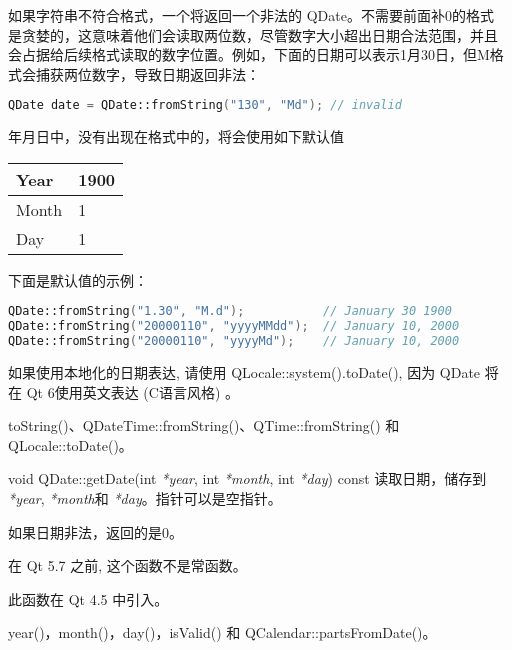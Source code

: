 如果字符串不符合格式，一个将返回一个非法的 QDate。不需要前面补0的格式
是贪婪的，这意味着他们会读取两位数，尽管数字大小超出日期合法范围，并且
会占据给后续格式读取的数字位置。例如，下面的日期可以表示1月30日，但M格
式会捕获两位数字，导致日期返回非法：

\begin{lstlisting}[language=C++]
QDate date = QDate::fromString("130", "Md"); // invalid
\end{lstlisting}

年月日中，没有出现在格式中的，将会使用如下默认值

\begin{tabular}{|l|l|}
\hline
Year&	1900\\
\hline
Month&	1\\
\hline
Day&	1\\
\hline
\end{tabular}

下面是默认值的示例：

\begin{lstlisting}[language=C++]
QDate::fromString("1.30", "M.d");           // January 30 1900
QDate::fromString("20000110", "yyyyMMdd");  // January 10, 2000
QDate::fromString("20000110", "yyyyMd");    // January 10, 2000
\end{lstlisting}



\begin{notice}
如果使用本地化的日期表达, 请使用 QLocale::system().toDate(), 因为 QDate 将在 Qt 6使用英文表达 (C语言风格) 。
\end{notice}


\begin{notice}[另请参阅]
toString()、QDateTime::fromString()、QTime::fromString() 和 QLocale::toDate()。
\end{notice}


\splitLine

void QDate::getDate(int  \emph{*year}, int \emph{*month}, int \emph{*day}) const
读取日期，储存到 \emph{*year},  \emph{*month}和 \emph{*day}。指针可以是空指针。

如果日期非法，返回的是0。

\begin{notice}
 在 Qt 5.7 之前, 这个函数不是常函数。
\end{notice}

此函数在 Qt 4.5 中引入。

\begin{notice}[另请参阅]
year()，month()，day()，isValid() 和
QCalendar::partsFromDate()。
\end{notice}

